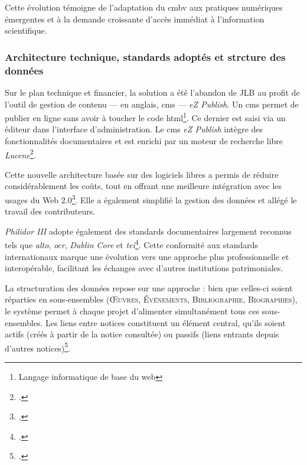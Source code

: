 Cette évolution témoigne de l'adaptation du \gls{cmbv} aux pratiques numériques émergentes et à la demande croissante d'accès immédiat à l'information scientifique.

\subsubsection{Architecture technique, standards adoptés et strcture des données}

Sur le plan technique et financier, la solution a été l’abandon de JLB au profit de l'outil de gestion de contenu — en anglais, \gls{cms} — \textit{eZ Publish}. Un \gls{cms} permet de publier en ligne sans avoir à toucher le code \gls{html}\footnote{Langage informatique de base du web}. Ce dernier est saisi via un éditeur dans l'interface d'administration. Le \gls{cms} \textit{eZ Publish} intègre des fonctionnalités documentaires et est enrichi par un moteur de recherche libre \textit{Lucene}\footcite{michelbenoitDocumentationTechniqueBibliographique1997}. 

Cette nouvelle architecture basée sur des logiciels libres a permis de réduire considérablement les coûts, tout en offrant une meilleure intégration avec les usages du Web 2.0\footcite{michelbenoitDocumentationTechniqueBibliographique1997}. Elle a également simplifié la gestion des données et allégé le travail des contributeurs.

\textit{Philidor III} adopte également des standards documentaires largement reconnus tels que \textit{\gls{alto}}, \textit{\gls{ocr}}, \textit{Dublin Core} et \textit{\gls{tei}}\footcite[Présentation de la base de données PHILIDOR en Octobre 2010]{michelbenoitDocumentationTechniqueBibliographique1997}. Cette conformité aux standards internationaux marque une évolution vers une approche plus professionnelle et interopérable, facilitant les échanges avec d'autres institutions patrimoniales.

La structuration des données repose sur une approche  : bien que celles-ci soient réparties en sous-ensembles (\textsc{Œuvres}, \textsc{Événements}, \textsc{Bibliographie}, \textsc{Biographies}), le système permet à chaque projet d'alimenter simultanément tous ces sous-ensembles. Les liens entre notices constituent un élément central, qu'ils soient actifs (créés à partir de la notice consultée) ou passifs (liens entrants depuis d'autres notices)\footcite[Rapport sur le projet Philidor de Jérémie Crublet, juin 2006]{michelbenoitDocumentationTechniqueBibliographique1997}.

